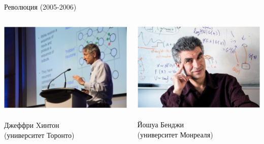 \documentclass[notes,12pt, aspectratio=169]{beamer}
\begin{document}
\begin{frame}{Революция (2005-2006)}
\begin{columns}[T] %
	\begin{column}{.48\textwidth}
		\centering \includegraphics[scale=0.16]{hinton.png}\\
		\mbox{ } \\
		\color{blue} Джеффри Xинтон \\
		\small (университет Торонто)
	\end{column}%
	\hfill%
	\begin{column}{.48\textwidth}
		\centering \includegraphics[scale=0.16]{bendji.png}\\
		\mbox{ } \\
		\color{blue}  Йошуа Бенджи \\
		\small (университет Монреаля)
	\end{column}%
\end{columns}
\end{frame}
\end{document}
